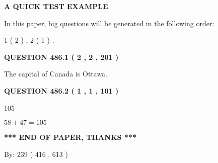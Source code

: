\documentclass[12pt]{article}
\begin{document}
   
   
   
   
   
 \vspace{0.2in}
{\LARGE {\textbf{ A QUICK TEST EXAMPLE}}}
   
   
   
\vspace{0.2in}
   
In this paper, big questions will be generated in the following order: 
   
   
   1 ( 2 )
 ,
   2 ( 1 )
 .
  
\vspace{0.2in}
  
{\textbf{\Large{QUESTION
486.1 
 ( 2 , 2 , 201 )
}}}
  
  
 
 
\noindent{}
 
 
The capital of Canada is Ottawa.
 
 
 
 
  
\vspace{0.2in}
  
{\textbf{\Large{QUESTION
486.2 
 ( 1 , 1 , 101 )
}}}
  
  
 
 
\noindent{}

105
 
 
 
 
\noindent{}

$ %
58 +  %
47=   %
105$
 
 
   
   
 \vspace{0.2in}
 
   
   
   
   
\vspace{1.0in} 
{\textbf{\large{ *** END OF PAPER, THANKS *** }}} 
   
   
\hspace{1.0in} By: 
 239 ( 416 ,  613 )
   
   
   
   
\newpage 
\setcounter{page}{ 
   487001 } 
   
\end{document}
